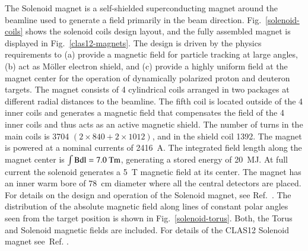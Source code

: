 \documentclass[final,3p,twocolumn]{elsarticle}
\begin{document}
The Solenoid magnet is a self-shielded superconducting magnet around the beamline used to generate a field primarily
in the beam direction. Fig.~\ref{solenoid-coils} shows the solenoid coils design layout, and the fully assembled magnet
is displayed in Fig.~\ref{clas12-magnets}. The design is driven by the physics requirements to (a) provide a magnetic
field for particle tracking at large angles, (b) act as {\rm M\"oller} electron shield, and (c) provide a highly uniform
field at the magnet center for the operation of dynamically polarized proton and deuteron targets. The magnet consists
of 4 cylindrical coils arranged in two packages at different radial distances to the beamline. The fifth coil is located
outside of the 4 inner coils and generates a magnetic field that compensates the field of the 4 inner coils and thus acts
as an active magnetic shield. The number of turns in the main coils is 3704 $(2 \times 840 + 2 \times 1012)$, and in the
shield coil 1392. The magnet is powered at a nominal currents of 2416~A. The integrated field length along the magnet
center is $\rm \int Bdl = 7.0 \rm~Tm$, generating a stored energy of 20~MJ. At full current the solenoid generates a
5~T magnetic field at its center. The magnet has an inner warm bore of 78~cm diameter where all the central detectors
are placed.  For details on the design and operation of the Solenoid magnet, see Ref.~\cite{clas12-magnets}. The
distribution of the absolute magnetic field along lines of constant polar angles seen from the target position is shown in
Fig.~\ref{solenoid-torus}. Both, the Torus and Solenoid magnetic fields are included. For details of the CLAS12 Solenoid
magnet see~Ref. \cite{clas12-magnets}. 
 
\end{document}

